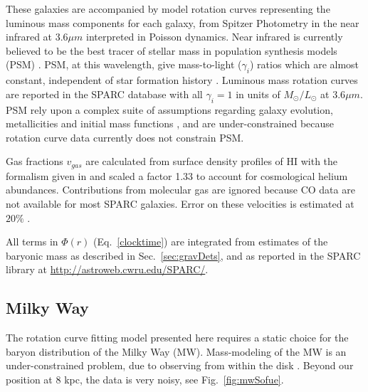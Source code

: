 \documentclass[reprint,%
 amsmath,amssymb,
 aps,
]{revtex4-1}
\begin{document}
These galaxies are  accompanied by model rotation curves representing   the  luminous mass components for each galaxy,  from   Spitzer Photometry in the 
   near infrared  at 3.6$\mu m$ interpreted in Poisson dynamics. 
   Near infrared  is  currently believed to be the best tracer of stellar mass   in population synthesis models (PSM) \cite{10.1093/mnras/sty3223}.  PSM, at this wavelength,   give mass-to-light ($\gamma_i$) ratios which are almost constant, independent of star formation history \cite{BelldYong,10.1093/mnras/sty3223}. Luminous mass rotation curves are reported in the SPARC database with all $\gamma_i=1$ in units of $M_{\odot} / L_{\odot}$   at 3.6$\mu m$. 
   PSM rely upon a complex  suite of  assumptions regarding galaxy evolution, metallicities and initial mass functions  \cite{BelldYong,10.1093/mnras/sty3223}, and are under-constrained   because rotation curve data currently does not constrain PSM\cite{Conroy}.   
   
     Gas fractions $v_{gas}$ are calculated from surface density profiles of HI  with the formalism given in  \cite{1983MNRAS.203..735C} and scaled 
     a factor 1.33 to account for cosmological helium abundances.  Contributions from molecular gas are ignored   because CO data are not available for most SPARC galaxies. 
     Error on these velocities is estimated at $20\%$ \cite{2016Lelli}. 

   
   
     All terms in $\Phi(r)$ (Eq.~\ref{clocktime})  are    integrated from estimates of the baryonic mass as described in Sec.~\ref{sec:gravDets}, and as reported  in the      SPARC  library at \url{http://astroweb.cwru.edu/SPARC/}.    

 
   

  
 


\subsection{Milky Way}\label{MWselect}


The rotation curve fitting model presented here requires a static choice for the baryon distribution of the   Milky Way (MW). 
Mass-modeling of the MW is an under-constrained problem, due to     observing from       within  the disk  \cite{1991ARA&A..29..409F}.
 Beyond our position at 8 kpc, the data is very 
 noisy, see  Fig.~\ref{fig:mwSofue}.  
 
\end{document}

